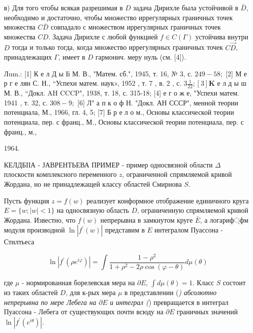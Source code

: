 \documentclass[10pt]{article}
\begin{document}
в) Для того чтобы всякая разрешимая в $D$ задача Дирихле была устойчивой в $\bar{D}$, необходимо и достаточно, чтобы множество иррегулярных граничных точек множества $C \bar{D}$ совпадало с множеством иррегулярных граничных точек множества $C D$. Задача Дирихле с любой функцией $f \in C(\Gamma)$ устойчива внутри $D$ тогда и только тогда, когда множество иррегулярных граничных точек $C \vec{D}$, принадлежащих $\Gamma$, имеет в $D$ гармонич. меру нуль (см. [4]).



Лum.: [1] К е л Д ы Іі М. В., "Матем. сб.", 1945, т. 16, № 3, с. $249-58 ;$ [2] М е р г е лян С. Н., “Успехи матем. наук», 1952 , т. 7 , в. 2 , с. $3 \frac{1}{22} ;[3] \mathbf{K}$ е л д ы ш М. В., “Докл. AH CCCP", 1938, т. 18, с. 315-18; [4] е г о ж е, "Успехи матем. 1941 , т. 32, с. $308-9 ;$ [6] Л" а п к о ф Н. "Докл. АН СССР", менной теории потенциала, М., 1966, гл. 4, 5; [7] Б р е л о м., Основы классической теории потенциала, пер. с франц., М., Основы классической теории потенциала, пер. с франц., м.,

1964.



КЕЛДБІІА - ЈАВРЕНТЬЕВА ПРИМЕР - пример односвязной области $\Delta$ плоскости комплексного переменного $z$, ограниченной спрямляемой кривой Жордана, но не принадлежащей классу областей Смирнова $S$.



Пусть функция $z=f(w)$ реализует конформное отображение единичного круга $E=\{w ;|w|<1\}$ на односвязную область $D$, ограниченную спрямляемой кривой Жордана. Известно, что $f(w)$ непрерывна в замкнутом круге $\bar{E}$, а логариф্фм модуля производной $\ln \left|f^{\prime}(w)\right|$ представим в $E$ интегралом Пуассона - Стилтьеса



\[

\ln \left|f^{\prime}\left(\rho e^{i \varphi}\right)\right|=\int \frac{1-\rho^{2}}{1+\rho^{2}-2 \rho \cos (\varphi-\theta)} d \mu(\theta)

\]



где $\mu$ - нормированная борелевская мера на $\partial E$, $\int d \mu(\theta)=1$. Класс $S$ состоит из таких областей $D$, для к-рых мера $\mu$ в представлении (\textit{) абсолютно непрерывна по мере Лебега на $\partial E$ и интеграл (}) превращается в интеграл Пуассона - Лебега от существующих почти всюду на $\partial E$ граничных значений $\ln \left|f^{\prime}\left(e^{i \theta}\right)\right|$.
\end{document}
